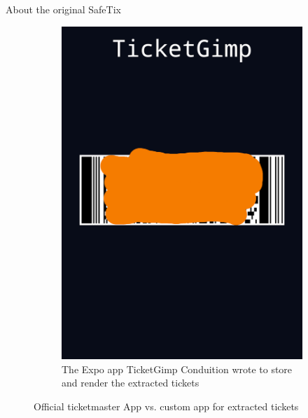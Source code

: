 \documentclass[final,dvipsnames]{beamer}
\newlength{\colwidth}
\begin{document}
\begin{frame}[t, fragile]
\begin{columns}[t]
\begin{column}{\colwidth}
\begin{block}{About the original SafeTix}
\begin{figure}[htbp]
\begin{subfigure}[t]{0.45\textwidth}
                \label{fig:app_barcode}
            \end{subfigure}
            \begin{subfigure}[t]{0.45\textwidth}
                \includegraphics[width=\textwidth]{figures/Conduition_custom_ticket_app.png}
                \caption{The Expo app TicketGimp Conduition wrote to store and render the extracted tickets \cite{reverse_engineering_ticketmaster}}
                \label{fig:conduition_custom_app}
            \end{subfigure}
            \caption{Official ticketmaster App vs. custom app for extracted tickets}
        \end{figure}
    \end{block}


\end{column}
\end{columns}
\end{frame}
\end{document}
